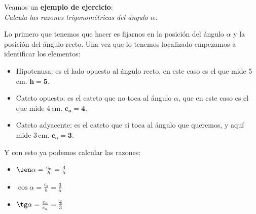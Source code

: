 \documentclass[a4paper,11pt,answers]{exam}
\begin{document}
Veamos un \textbf{ejemplo de ejercicio}:\\
\emph{Calcula las razones trigonométricas del ángulo $\alpha$:}
\begin{center}
\end{center}
\begin{solution}
  Lo primero que tenemos que hacer es fijarnos en la posición del ángulo $\alpha$ y la posición del ángulo recto. Una vez que lo tenemos localizado empezamos a identificar los elementos:
  \begin{itemize}
  \item Hipotenusa: es el lado opuesto al ángulo recto, en este caso es el que mide 5\,cm. $\boldsymbol{h=5}.$
  \item Cateto opuesto: es el cateto que no toca al ángulo $\alpha$, que en este caso es el que mide 4\,cm. $\boldsymbol{c_o = 4}$.
  \item Cateto adyacente: es el cateto que sí toca al ángulo que queremos, y aquí mide 3\,cm. $\boldsymbol{c_a = 3}$.
  \end{itemize}
  Y con esto ya podemos calcular las razones:
  \begin{itemize}
  \item $\sen \alpha = \frac{c_o}{h} = \frac{4}{5}$
  \item $\cos \alpha = \frac{c_a}{h} = \frac{3}{5}$
  \item $\tg \alpha = \frac{c_o}{c_a} = \frac{4}{3}$
  \end{itemize}
    
\end{solution}
\end{document}
